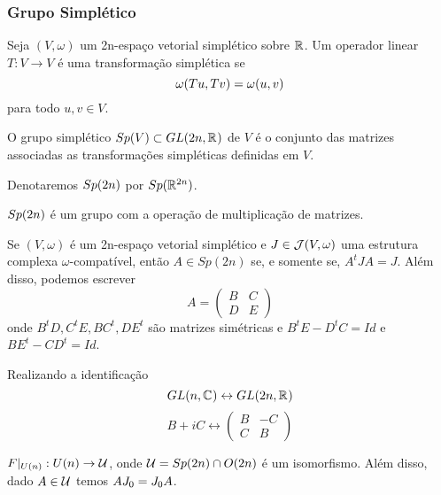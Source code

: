 \documentclass{beamer}
\begin{document}
	\begin{frame}
		\frametitle{Grupo Simplético}
		
		\begin{definicao}
			Seja $(V, \omega)$ um 2n-espaço vetorial simplético sobre $\mathbb{R}^{}$. Um operador linear $T: V \to V$ é uma transformação simplética se 
			$$
			\omega(Tu, Tv) = \omega(u, v)
			$$ para todo $u,v\in V$.
		\end{definicao}
		
		\begin{definicao}
			O grupo simplético $Sp(V) \subset GL(2n, \mathbb{R}^{})$ de $V$ é o conjunto das matrizes associadas as transformações simpléticas definidas em $V$.
		\end{definicao}	
		
		Denotaremos $Sp(2n)$ por $Sp(\mathbb{R}^{2n})$.
		
	\end{frame}
	
	\begin{frame}
		\begin{proposicao}
			$Sp(2n)$ é um grupo com a operação de multiplicação de matrizes.
		\end{proposicao}
		
		\begin{lema}[Caracterização de $Sp(2n)$]
			 Se $(V, \omega)$ é um 2n-espaço vetorial simplético e $J \in \mathcal{J}(V, \omega)$ uma estrutura complexa $\omega$-compatível, então $A\in Sp(2n)$ se, e somente se, $A^{t}JA = J$. Além disso, podemos escrever 
			$$
			A=
			\left(
			\begin{array}{cc}
			B & C
			\\
			D & E
			\end{array}
			\right)
			$$
			onde $B^{t}D, C^{t}E, BC^{t}, DE^{t} $ são matrizes simétricas e $B^{t}E - D^{t}C = Id$ e $BE^{t} - CD^{t} = Id$.
		\end{lema}
	\end{frame}
	
	\begin{frame}
		Realizando a identificação
		$$
		GL(n, \mathbb{C}^{})\leftrightarrow GL(2n, \mathbb{R}^{})
		$$
		$$
		B+iC \leftrightarrow
		\left(
		\begin{array}{cc}
		B & -C
		\\
		C & B
		\end{array}
		\right)
		$$  
		\begin{lema}
			$F|_{U(n)}: U(n) \to \mathcal{U} $, onde $\mathcal{U}  = Sp(2n)\cap O(2n)$ é um isomorfismo. Além disso, dado $A \in \mathcal{U} $ temos $AJ_{0}=J_{0} A$.
		\end{lema}
	\end{frame}
	
\end{document}
